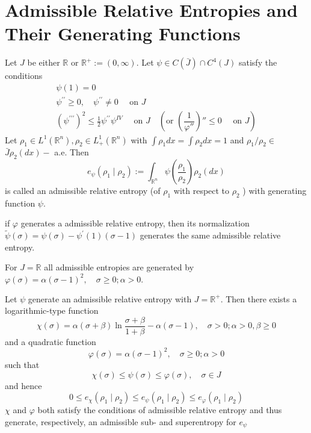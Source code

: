 \section{Admissible Relative Entropies and Their Generating
	Functions}

\begin{definition}
	 Let $J$ be either $\mathbb{R}$ or $\mathbb{R}^{+}:=(0, \infty) .$ Let $\psi \in C(\bar{J}) \cap C^{4}(J)$ satisfy the conditions
	$$
	\begin{array}{l}
	\psi(1)=0 \\
	\psi^{\prime \prime} \geq 0, \quad \psi^{\prime \prime} \neq 0 \quad \text { on } J \\
	\left(\psi^{\prime \prime \prime}\right)^{2} \leq \frac{1}{2} \psi^{\prime \prime} \psi^{I V} \quad \text { on } J \quad (\text{or } (\dfrac1{\varphi''})''\leqslant0 \quad \text { on } J)
	\end{array}
	$$
	Let $\rho_{1} \in L^{1}\left(\mathbb{R}^{n}\right), \rho_{2} \in L_{+}^{1}\left(\mathbb{R}^{n}\right)$ with $\int \rho_{1} d x=\int \rho_{2} d x=1$ and $\rho_{1} / \rho_{2} \in$
	$\bar{J} \rho_{2}(d x)-$ a.e. Then
	$$
	e_{\psi}\left(\rho_{1} \mid \rho_{2}\right):=\int_{\mathbb{R}^{n}} \psi\left(\frac{\rho_{1}}{\rho_{2}}\right) \rho_{2}(d x)
	$$
	is called an admissible relative entropy (of $\rho_{1}$ with respect to $\rho_{2}$ ) with generating function $\psi$.
\end{definition}

if \(\varphi\) generates a admissible relative entropy, then its normalization $\tilde{\psi}(\sigma)=\psi(\sigma)-\psi^{\prime}(1)(\sigma-1)$ generates the same admissible relative entropy.

\begin{lemma}\label{entropy_on_R}
	For $J=\mathbb{R}$ all admissible entropies are generated by $\varphi(\sigma)=\alpha(\sigma-1)^{2}, \quad \sigma \geq 0 ; \alpha>0 .$
\end{lemma}

\begin{lemma}
 Let $\psi$ generate an admissible relative entropy with $J=\mathbb{R}^{+} .$ Then there exists a logarithmic-type function 
 \begin{equation}\label{logarithmic-type-entropy-generator}
 \chi(\sigma)=\alpha(\sigma+\beta) \ln \frac{\sigma+\beta}{1+\beta}-\alpha(\sigma-1), \quad \sigma>0 ; \alpha>0, \beta \geq 0\end{equation}
  and a quadratic function
  \begin{equation}\varphi(\sigma)=\alpha(\sigma-1)^{2}, \quad \sigma \geq 0 ; \alpha>0\end{equation}
   such that
$$
\chi(\sigma) \leq \psi(\sigma) \leq \varphi(\sigma), \quad \sigma \in J
$$
and hence
$$
0 \leq e_{\chi}\left(\rho_{1} \mid \rho_{2}\right) \leq e_{\psi}\left(\rho_{1} \mid \rho_{2}\right) \leq e_{\varphi}\left(\rho_{1} \mid \rho_{2}\right)
$$
\(\chi\) and $\varphi$ both satisfy the conditions of admissible relative entropy and thus generate, respectively, an admissible sub- and superentropy for $e_{\psi}$	
\end{lemma}

